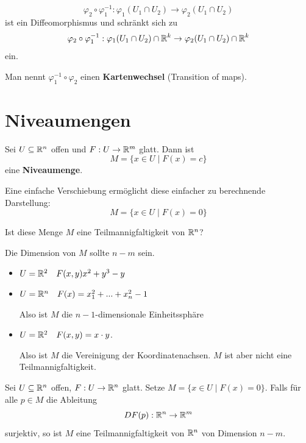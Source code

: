 \documentclass[main.tex]{subfiles}
\begin{document}
\begin{Definition}[Kartenwechsel]
  $$\varphi_2 \circ \varphi_1^{-1} : \varphi_1(U_1 \cap U_2) \to \varphi_2(U_1 \cap U_2)$$
  ist ein Diffeomorphismus und schränkt sich zu
  $$\varphi_2 \circ \varphi_1^{-1} : \varphi_1(U_1 \cap U_2) \cap \mathbb{R}^k \to \varphi_2(U_1 \cap U_2) \cap \mathbb{R}^k$$
  ein.

  Man nennt $\varphi_1^{-1} \circ \varphi_2$ einen \textbf{Kartenwechsel} (Transition of maps).
\end{Definition}


\section{Niveaumengen}

\begin{Definition}
  Sei $U \subseteq \mathbb{R}^n$ offen und $F: U \to \mathbb{R}^m$ glatt. Dann ist
  $$M = \{ x \in U \mid F(x) = c \}$$
  eine \textbf{Niveaumenge}.

  Eine einfache Verschiebung ermöglicht diese einfacher zu berechnende Darstellung:
  $$M = \{ x \in U \mid F(x) = 0 \}$$
\end{Definition}

Ist diese Menge $M$ eine Teilmannigfaltigkeit von $\mathbb{R}^n$?

Die Dimension von $M$ sollte $n - m$ sein.

\begin{Beispiel}
  \begin{itemize}
    \item $U = \mathbb{R}^2 \quad F(x,y) x^2 + y^3 - y$
    \item $U = \mathbb{R}^n \quad F(x) = x_1^2 + ... + x_n^2 - 1$

      Also ist $M$ die $n-1$-dimensionale Einheitssphäre
    \item $U = \mathbb{R}^2 \quad F(x,y) = x \cdot y$.

      Also ist $M$ die Vereinigung der Koordinatenachsen. $M$ ist aber nicht eine Teilmannigfaltigkeit.
  \end{itemize}
\end{Beispiel}

\begin{Theorem}
  Sei $U \subseteq \mathbb{R}^n$ offen, $F: U \to \mathbb{R}^n$ glatt. Setze $M = \{ x \in U \mid F(x) = 0 \}$. Falls für alle $p \in M$ die Ableitung
  $$DF(p): \mathbb{R}^n \to \mathbb{R}^m$$
  surjektiv, so ist $M$ eine Teilmannigfaltigkeit von $\mathbb{R}^n$ von Dimension $n - m$.
\end{Theorem}
\end{document}
